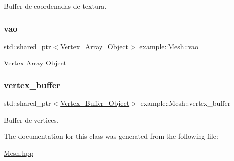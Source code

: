 Buffer de coordenadas de textura. 

\mbox{\label{classexample_1_1_mesh_a11c5511c7117fcd333ccb17b9a66c316}} 
\subsubsection{\texorpdfstring{vao}{vao}}
{\footnotesize\ttfamily std\+::shared\+\_\+ptr$<$\mbox{\hyperlink{classexample_1_1_vertex___array___object}{Vertex\+\_\+\+Array\+\_\+\+Object}}$>$ example\+::\+Mesh\+::vao\hspace{0.3cm}{\ttfamily [protected]}}



Vertex Array Object. 

\mbox{\label{classexample_1_1_mesh_a9a1e6b7058389c23eef2193c1c5d644c}} 
\subsubsection{\texorpdfstring{vertex\_buffer}{vertex\_buffer}}
{\footnotesize\ttfamily std\+::shared\+\_\+ptr$<$\mbox{\hyperlink{classexample_1_1_vertex___buffer___object}{Vertex\+\_\+\+Buffer\+\_\+\+Object}}$>$ example\+::\+Mesh\+::vertex\+\_\+buffer\hspace{0.3cm}{\ttfamily [protected]}}



Buffer de vertices. 



The documentation for this class was generated from the following file\+:\begin{DoxyCompactItemize}
\item 
\mbox{\hyperlink{_mesh_8hpp}{Mesh.\+hpp}}\end{DoxyCompactItemize}
